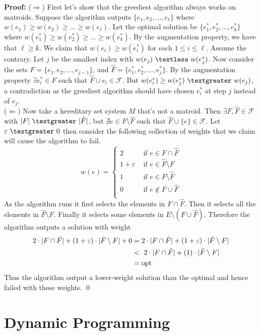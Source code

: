 \documentclass{article}
\newcommand{\ep}{\varepsilon}
\newcommand{\lt}{\textless}
\newcommand{\gt}{\textgreater}
\newcommand{\imply}{\Rightarrow}
\newcommand{\limply}{\Leftarrow}
\newcommand{\x}{\cdot}
\newcommand{\proo}{\textbf{Proof: }}
\newcommand{\mcal}[1]{\mathcal{#1}}
\newcommand{\opt}{\text{opt}}
\newcommand{\sm}{\setminus}
\begin{document}
\proo ($\imply$) First let's show that the greediest algorithm always works on matroids. Suppose the algorithm outputs $\{e_1, e_2, \dots, e_{\ell}\}$ where $w(e_1) \geq w(e_2) \geq \dots \geq w(e_{\ell})$. Let the optimal solution be $\{e_1^*, e_2^*, \dots, e_k^*\}$ where $w(e_1^*) \geq w(e_2^*) \geq \dots \geq w(e_k^*)$. By the augmentation property, we have that $\ell \geq k$. We claim that $w(e_i) \geq w(e_i^*)$ for each $1 \leq i \leq \ell$. Assume the contrary. Let $j$ be the smallest index with $w(e_j)\ \lt\ w(e_j^*)$. Now consider the sets $F = \{e_1, e_2, \dots, e_{j-1}\}$, and $\hat{F} = \{e_1^*, e_2^*, \dots, e_j^*\}$. By the augmentation property $\exists e_i^* \in F$ such that $\hat{F} \cup e_i \in \mcal{F}$. But $w(e_i^*) \geq w(e_j^*)\ \gt\ w(e_j)$, a contradiction as the greediest algorithm should have chosen $e_i^*$ at step $j$ instead of $e_j$.\\
($\limply$) Now take a hereditary set system $M$ that's not a matroid. Then $\exists F, \hat{F} \in \mcal{F}$ with $|F|\ \gt\ |\hat{F}|$, but $\nexists e \in F \sm \hat{F}$ such that $\hat{F} \cup \{e\} \in \mcal{F}$. Let $\ep\ \gt\ 0$ then consider the following collection of weights that we claim will cause the algorithm to fail.
\[ w(e) =
\begin{cases}
	2 &\text{ if } e \in F \cap \hat{F}\\
	1 + \ep &\text{ if } e \in \hat{F} \sm F\\
	1 &\text{ if } e \in F \sm \hat{F}\\
	0 &\text{ if } e \notin F \cup \hat{F}\\
\end{cases}
\]
As the algorithm runs it first selects the elements in $F \cap \hat{F}$. Then it selects all the elements in $\hat{F} \sm F$. Finally it selects some elements in $E \sm (F\cup\hat{F})$. Therefore the algorithm outputs a solution with weight
\begin{align*}
2\x |F \cap \hat{F}| + (1 + \ep)\x|\hat{F}\sm F| + 0 &= 2\x |F \cap \hat{F}| + (1 + \ep)\x|\hat{F}\sm F|\\
	&\lt\ 2\x |F \cap \hat{F}| + (1)\x|\hat{F}\sm F|\\
	&= \opt
\end{align*}
Thus the algorithm output a lower-weight solution than the optimal and hence failed with these weights.
\qed 
\newpage


\section{Dynamic Programming}
\end{document}
